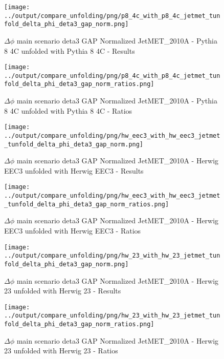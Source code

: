 \documentclass[11pt]{book}
\begin{document}
\begin{figure}[ht]
\centering
\texttt{[image: ../output/compare\_unfolding/png/p8\_4c\_with\_p8\_4c\_jetmet\_tunfold\_delta\_phi\_deta3\_gap\_norm.png]}
\caption{$\Delta\phi$ main scenario deta3 GAP Normalized JetMET\_2010A - Pythia 8 4C unfolded with Pythia 8 4C - Results}
\label{p8_p8_jetmet_tunfold_delta_phi_deta3_gap_norm_a}
\end{figure}

\begin{figure}[ht]
\centering
\texttt{[image: ../output/compare\_unfolding/png/p8\_4c\_with\_p8\_4c\_jetmet\_tunfold\_delta\_phi\_deta3\_gap\_norm\_ratios.png]}
\caption{$\Delta\phi$ main scenario deta3 GAP Normalized JetMET\_2010A - Pythia 8 4C unfolded with Pythia 8 4C - Ratios}
\label{p8_p8_jetmet_tunfold_delta_phi_deta3_gap_norm_b}
\end{figure}

\begin{figure}[ht]
\centering
\texttt{[image: ../output/compare\_unfolding/png/hw\_eec3\_with\_hw\_eec3\_jetmet\_tunfold\_delta\_phi\_deta3\_gap\_norm.png]}
\caption{$\Delta\phi$ main scenario deta3 GAP Normalized JetMET\_2010A - Herwig EEC3 unfolded with Herwig EEC3 - Results}
\label{hw_eec3_hw_eec3_jetmet_tunfold_delta_phi_deta3_gap_norm_a}
\end{figure}

\begin{figure}[ht]
\centering
\texttt{[image: ../output/compare\_unfolding/png/hw\_eec3\_with\_hw\_eec3\_jetmet\_tunfold\_delta\_phi\_deta3\_gap\_norm\_ratios.png]}
\caption{$\Delta\phi$ main scenario deta3 GAP Normalized JetMET\_2010A - Herwig EEC3 unfolded with Herwig EEC3 - Ratios}
\label{hw_eec3_hw_eec3_jetmet_tunfold_delta_phi_deta3_gap_norm_b}
\end{figure}

\begin{figure}[ht]
\centering
\texttt{[image: ../output/compare\_unfolding/png/hw\_23\_with\_hw\_23\_jetmet\_tunfold\_delta\_phi\_deta3\_gap\_norm.png]}
\caption{$\Delta\phi$ main scenario deta3 GAP Normalized JetMET\_2010A - Herwig 23 unfolded with Herwig 23 - Results}
\label{hw_23_hw_23_jetmet_tunfold_delta_phi_deta3_gap_norm_a}
\end{figure}

\begin{figure}[ht]
\centering
\texttt{[image: ../output/compare\_unfolding/png/hw\_23\_with\_hw\_23\_jetmet\_tunfold\_delta\_phi\_deta3\_gap\_norm\_ratios.png]}
\caption{$\Delta\phi$ main scenario deta3 GAP Normalized JetMET\_2010A - Herwig 23 unfolded with Herwig 23 - Ratios}
\label{hw_23_hw_23_jetmet_tunfold_delta_phi_deta3_gap_norm_b}
\end{figure}
\end{document}
